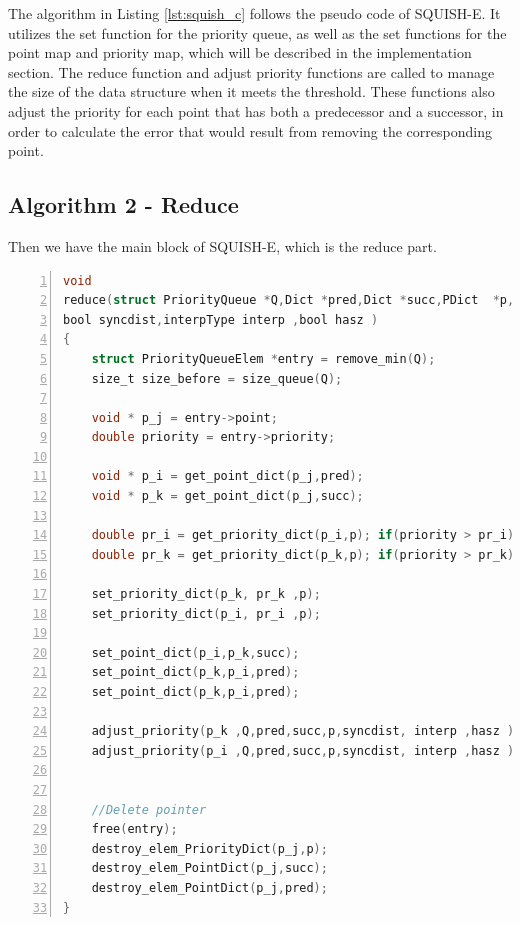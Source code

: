 The algorithm in Listing \ref{lst:squish_c} follows the pseudo code of SQUISH-E. It utilizes the set function for the priority queue, as well as the set functions for the point map and priority map, which will be described in the implementation section. The reduce function and adjust priority functions are called to manage the size of the data structure when it meets the threshold. These functions also adjust the priority for each point that has both a predecessor and a successor, in order to calculate the error that would result from removing the corresponding point.

\subsection{Algorithm 2 - Reduce}
Then we have the main block of SQUISH-E, which is the reduce part.



\begin{lstlisting}[language=C, % Spécifie le langage du code
caption={Implementation of the reduce function in C.}, % Légende du listing
label=lst:reduce_c, % Étiquette pour référencer le listing
numbers=left,
numberstyle=\tiny\color{gray},
stepnumber=1,
frame=single,
breaklines=true,
postbreak=\mbox{\textcolor{red}{$\hookrightarrow$}\space},
showstringspaces=false,
float,
floatplacement=H
]
void
reduce(struct PriorityQueue *Q,Dict *pred,Dict *succ,PDict  *p,
bool syncdist,interpType interp ,bool hasz )
{
	struct PriorityQueueElem *entry = remove_min(Q);
	size_t size_before = size_queue(Q);
	
	void * p_j = entry->point;
	double priority = entry->priority;
	
	void * p_i = get_point_dict(p_j,pred);
	void * p_k = get_point_dict(p_j,succ);
	
	double pr_i = get_priority_dict(p_i,p); if(priority > pr_i){ pr_i = priority; }
	double pr_k = get_priority_dict(p_k,p); if(priority > pr_k){ pr_k = priority; }
	
	set_priority_dict(p_k, pr_k ,p);
	set_priority_dict(p_i, pr_i ,p);
	
	set_point_dict(p_i,p_k,succ);
	set_point_dict(p_k,p_i,pred);
	set_point_dict(p_k,p_i,pred);
	
	adjust_priority(p_k ,Q,pred,succ,p,syncdist, interp ,hasz );
	adjust_priority(p_i ,Q,pred,succ,p,syncdist, interp ,hasz );
	
	
	//Delete pointer
	free(entry);
	destroy_elem_PriorityDict(p_j,p);
	destroy_elem_PointDict(p_j,succ);
	destroy_elem_PointDict(p_j,pred);
}

\end{lstlisting}

